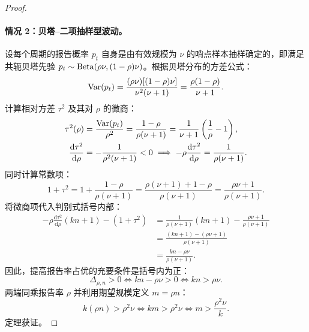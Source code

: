 \begin{proof}
\paragraph{情况 2：贝塔--二项抽样型波动。}
设每个周期的报告概率 $p_t$ 自身是由有效规模为 $\nu$ 的哨点样本抽样确定的，即满足共轭贝塔先验 $p_t \sim \mathrm{Beta}(\rho\nu, (1-\rho)\nu)$。根据贝塔分布的方差公式：
\begin{equation}
  \mathrm{Var}(p_t) = \frac{(\rho\nu)[(1-\rho)\nu]}{\nu^2(\nu + 1)} = \frac{\rho(1-\rho)}{\nu + 1}.
\end{equation}
计算相对方差 $\tau^2$ 及其对 $\rho$ 的微商：
\begin{align}
  \tau^2(\rho) &= \frac{\mathrm{Var}(p_t)}{\rho^2} = \frac{1-\rho}{\rho(\nu + 1)} = \frac{1}{\nu+1}\left( \frac{1}{\rho} - 1 \right), \\
  \frac{\mathrm{d}\tau^2}{\mathrm{d}\rho} &= -\frac{1}{\rho^2(\nu + 1)} < 0 \implies -\rho\frac{\mathrm{d}\tau^2}{\mathrm{d}\rho} = \frac{1}{\rho(\nu + 1)}.
\end{align}
同时计算常数项：
\begin{equation}
  1 + \tau^2 = 1 + \frac{1-\rho}{\rho(\nu + 1)} = \frac{\rho(\nu+1) + 1 - \rho}{\rho(\nu + 1)} = \frac{\rho\nu + 1}{\rho(\nu + 1)}.
\end{equation}
将微商项代入判别式括号内部：
\begin{align}
  -\rho\frac{\mathrm{d}\tau^2}{\mathrm{d}\rho}(kn + 1) - (1 + \tau^2) &= \frac{1}{\rho(\nu+1)}(kn + 1) - \frac{\rho\nu + 1}{\rho(\nu+1)} \nonumber \\
  &= \frac{(kn + 1) - (\rho\nu + 1)}{\rho(\nu + 1)} \nonumber \\
  &= \frac{kn - \rho\nu}{\rho(\nu + 1)}.
\end{align}
因此，提高报告率占优的充要条件是括号内为正：
\begin{equation}
  \Delta_{\rho, n} > 0 \iff kn - \rho\nu > 0 \iff kn > \rho\nu.
\end{equation}
两端同乘报告率 $\rho$ 并利用期望规模定义 $m = \rho n$：
\begin{equation}
  k(\rho n) > \rho^2 \nu \iff km > \rho^2 \nu \iff m > \frac{\rho^2 \nu}{k}.
\end{equation}
定理获证。
\end{proof}

